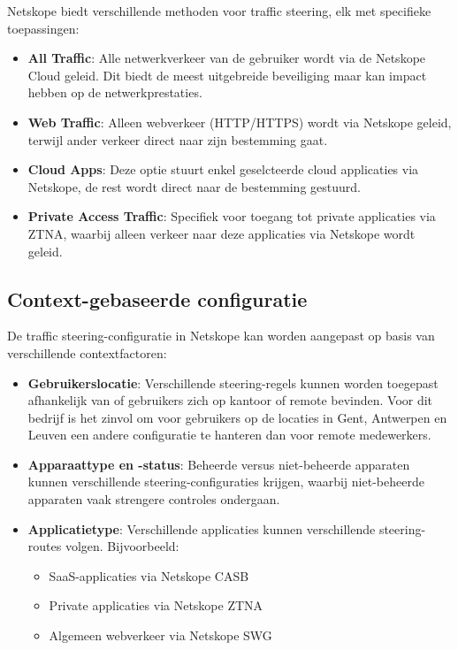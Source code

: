 Netskope biedt verschillende methoden voor traffic steering, elk met specifieke toepassingen:

\begin{itemize}
    \item \textbf{All Traffic}: Alle netwerkverkeer van de gebruiker wordt via de Netskope Cloud geleid. Dit biedt de meest uitgebreide beveiliging maar kan impact hebben op de netwerkprestaties.
    \item \textbf{Web Traffic}: Alleen webverkeer (HTTP/HTTPS) wordt via Netskope geleid, terwijl ander verkeer direct naar zijn bestemming gaat.
    \item \textbf{Cloud Apps}: Deze optie stuurt enkel geselcteerde cloud applicaties via Netskope, de rest wordt direct naar de bestemming gestuurd.
    \item \textbf{Private Access Traffic}: Specifiek voor toegang tot private applicaties via ZTNA, waarbij alleen verkeer naar deze applicaties via Netskope wordt geleid.
\end{itemize}
\subsection{Context-gebaseerde configuratie}

De traffic steering-configuratie in Netskope kan worden aangepast op basis van verschillende contextfactoren:

\begin{itemize}
    \item \textbf{Gebruikerslocatie}: Verschillende steering-regels kunnen worden toegepast afhankelijk van of gebruikers zich op kantoor of remote bevinden. Voor dit bedrijf is het zinvol om voor gebruikers op de locaties in Gent, Antwerpen en Leuven een andere configuratie te hanteren dan voor remote medewerkers.
    \item \textbf{Apparaattype en -status}: Beheerde versus niet-beheerde apparaten kunnen verschillende steering-configuraties krijgen, waarbij niet-beheerde apparaten vaak strengere controles ondergaan.
    \item \textbf{Applicatietype}: Verschillende applicaties kunnen verschillende steering-routes volgen. Bijvoorbeeld:
        \begin{itemize}
            \item SaaS-applicaties via Netskope CASB
            \item Private applicaties via Netskope ZTNA
            \item Algemeen webverkeer via Netskope SWG
        \end{itemize}
\end{itemize}
